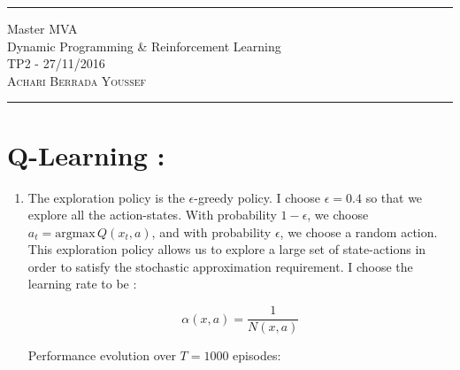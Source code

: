 \documentclass[a4paper,10pt]{article}
\begin{document}
\begin{center}
\rule{\textwidth}{3pt}
Master MVA \\
Dynamic Programming \& Reinforcement Learning \\
TP2 - 27/11/2016 \\
\textsc{ Achari Berrada Youssef} \\
\rule{\textwidth}{.3pt}
\end{center}

\section{Q-Learning :}
\begin{enumerate}[label=\underline{\textbf{Q\arabic*}:}]
\item The exploration policy is the $\epsilon$-greedy policy. I choose $\epsilon = 0.4$ so that we explore all the action-states.
With probability $1 - \epsilon$, we choose $ a_t = \text{argmax} \, Q(x_t,a)$, and with probability $\epsilon$, we choose a random action. This exploration policy allows us to explore a large set of state-actions in order to satisfy the stochastic approximation requirement. I choose the learning rate to be : 

\[ \alpha(x,a) = \frac{1}{N(x,a)}\]

Performance evolution over $T = 1000$ episodes: 


\end{enumerate}
\end{document}
